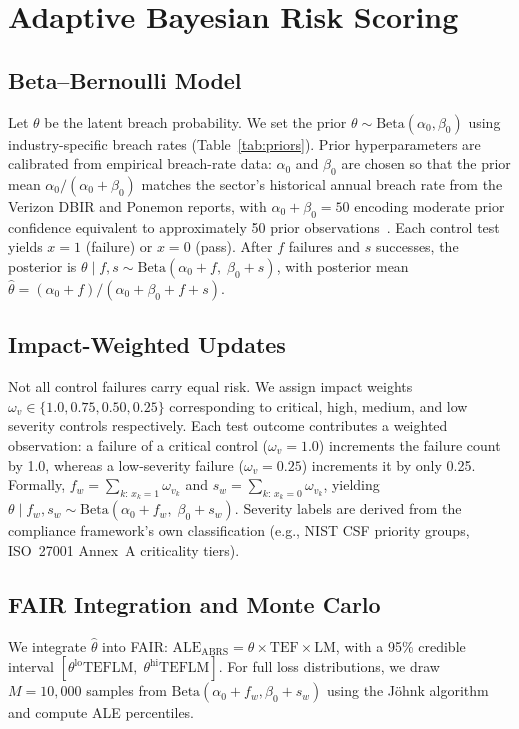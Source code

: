\documentclass[conference]{IEEEtran}
\newcommand{\ABRS}{\mathrm{ABRS}}
\newcommand{\ALE}{\mathrm{ALE}}
\newcommand{\TEF}{\mathrm{TEF}}
\newcommand{\LM}{\mathrm{LM}}
\begin{document}
\section{Adaptive Bayesian Risk Scoring}
\label{sec:abrs}

\subsection{Beta--Bernoulli Model}
Let $\theta$ be the latent breach probability. We set the prior $\theta\sim \mathrm{Beta}(\alpha_0,\beta_0)$ using industry-specific breach rates (Table~\ref{tab:priors}). Prior hyperparameters are calibrated from empirical breach-rate data: $\alpha_0$ and $\beta_0$ are chosen so that the prior mean $\alpha_0/(\alpha_0+\beta_0)$ matches the sector's historical annual breach rate from the Verizon DBIR and Ponemon reports, with $\alpha_0+\beta_0=50$ encoding moderate prior confidence equivalent to approximately 50 prior observations~\cite{Hubbard2016}. Each control test yields $x=1$ (failure) or $x=0$ (pass). After $f$ failures and $s$ successes, the posterior is $\theta \mid f,s \sim \mathrm{Beta}(\alpha_0+f,\;\beta_0+s)$, with posterior mean $\hat\theta = (\alpha_0+f)/(\alpha_0+\beta_0+f+s)$.

\subsection{Impact-Weighted Updates}
\label{sec:impact_weight}
Not all control failures carry equal risk. We assign impact weights $\omega_v \in \{1.0, 0.75, 0.50, 0.25\}$ corresponding to critical, high, medium, and low severity controls respectively. Each test outcome contributes a weighted observation: a failure of a critical control ($\omega_v=1.0$) increments the failure count by 1.0, whereas a low-severity failure ($\omega_v=0.25$) increments it by only 0.25. Formally, $f_w = \sum_{k:\,x_k=1} \omega_{v_k}$ and $s_w = \sum_{k:\,x_k=0} \omega_{v_k}$, yielding $\theta \mid f_w, s_w \sim \mathrm{Beta}(\alpha_0 + f_w,\; \beta_0 + s_w)$. Severity labels are derived from the compliance framework's own classification (e.g., NIST CSF priority groups, ISO~27001 Annex~A criticality tiers).

\subsection{FAIR Integration and Monte Carlo}
We integrate $\hat\theta$ into FAIR: $\ALE_{\ABRS} = \hat\theta \times \TEF \times \LM$, with a 95\% credible interval $[\theta^{\mathrm{lo}}\TEF\LM,\;\theta^{\mathrm{hi}}\TEF\LM]$. For full loss distributions, we draw $M{=}10{,}000$ samples from $\mathrm{Beta}(\alpha_0{+}f_w,\beta_0{+}s_w)$ using the J\"ohnk algorithm~\cite{Johnk1964} and compute ALE percentiles.
\end{document}
